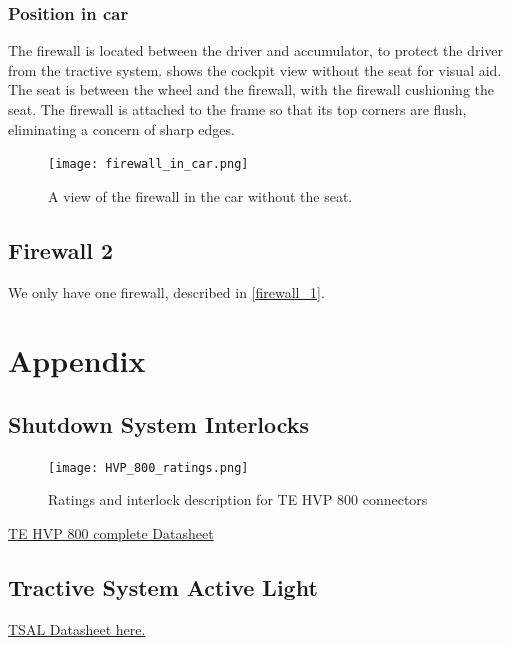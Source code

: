 \documentclass{article}
\begin{document}
\subsubsection{Position in car}
The firewall is located between the driver and accumulator, to protect the driver from the tractive system.  shows the cockpit view without the seat for visual aid. The seat is between the wheel and the firewall, with the firewall cushioning the seat.  The firewall is attached to the frame so that its top corners are flush, eliminating a concern of sharp edges.

\begin{figure}[H]
    \centering
    \texttt{[image: firewall\_in\_car.png]}
    \caption{A view of the firewall in the car without the seat. }
    \label{fig:firewall_in_car}
\end{figure}

\subsection{Firewall 2}\label{firewall_2}
We only have one firewall, described in \ref{firewall_1}.

\section{Appendix}\label{appendix}


\subsection{Shutdown System Interlocks}\label{sec:appendix_interlocks}
\begin{figure}[H]
	\texttt{[image: HVP\_800\_ratings.png]}
	\caption{Ratings and interlock description for TE HVP 800 connectors}
	\label{fig:hvp_800_ratings}
\end{figure}
\href{http://www.te.com/content/dam/te-com/documents/hybrid-and-electric-mobility-solutions/global/8-1773462-1-hvp-800.pdf}{TE HVP 800 complete Datasheet}

\hypertarget{TSALdatasheet}{}
\subsection{Tractive System Active Light}
\href{https://d114hh0cykhyb0.cloudfront.net/pdfs/MSTRB-X-X+Mini+Strobe+LED.pdf}{TSAL Datasheet here.}
\end{document}
